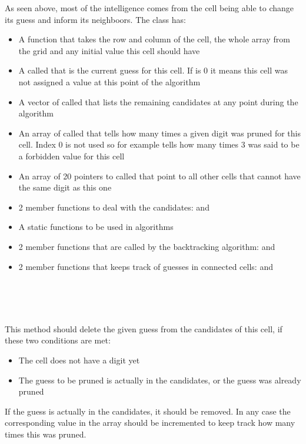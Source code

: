 \documentclass{ecnreport}
\begin{document}
As seen above, most of the intelligence comes from the cell being able to change its guess and inform its neighboors.
The \Cell class has:
\begin{itemize}
 \item A  function that takes the row and column of the cell, the whole  array from the grid and any initial value this cell should have
 \item A  called  that is the current guess for this cell. If  is 0 it means this cell was not assigned a value at this point of the algorithm
 \item A vector of  called  that lists the remaining candidates at any point during the algorithm
 \item An array of  called  that tells how many times a given digit was pruned for this cell. Index 0 is not used so for example  tells how many times 3 was said to be a forbidden value for this cell
 \item An array of 20 pointers to \Cell called  that point to all other cells that cannot have the same digit as this one
 \item 2 member functions to deal with the candidates:  and 
 \item A static functions  to be used in algorithms
 \item 2 member functions that are called by the backtracking algorithm:  and 
 \item 2 member functions that keeps track of guesses in connected cells:  and 
\end{itemize}


\paragraph{\bf {}}~\\

 \begin{minipage}{.5cm}
~
 \end{minipage}
 \begin{minipage}{0.9\linewidth}
    This method should delete the given guess from the candidates of this cell, if these two conditions are met:

\begin{itemize}
 \item The cell does not have a digit yet
 \item The guess to be pruned is actually in the candidates, or the guess was already pruned
\end{itemize}

If the guess is actually in the candidates, it should be removed. In any case the corresponding value in the  array should be incremented to keep track how many times this was pruned.
 \end{minipage}
\end{document}
